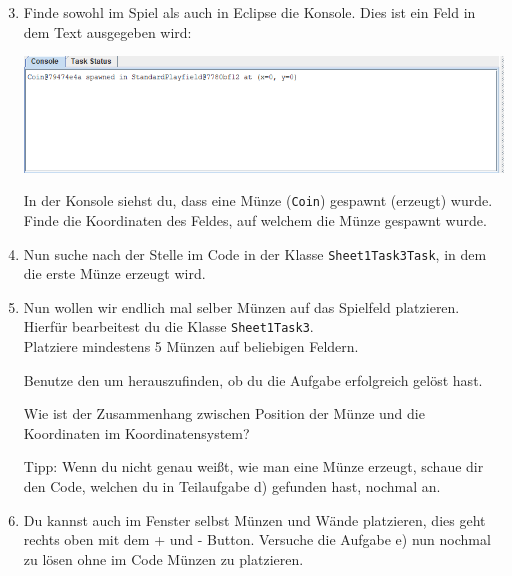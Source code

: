 \begin{enumerate}\setcounter{enumi}{2}

    \item Finde sowohl im Spiel als auch in Eclipse die Konsole. Dies ist ein Feld in dem Text ausgegeben wird:
    \begin{center}
        \includegraphics[width=\linewidth]{./figures/console.PNG}
    \end{center}

    In der Konsole siehst du, dass eine Münze (\texttt{Coin}) gespawnt (erzeugt) wurde.
    Finde die Koordinaten des Feldes, auf welchem die Münze gespawnt wurde.

    \item Nun suche nach der Stelle im Code in der Klasse \lstinline{Sheet1Task3Task}, in dem die erste Münze erzeugt wird.\\

    \item Nun wollen wir endlich mal selber Münzen auf das Spielfeld platzieren.
        Hierfür bearbeitest du die Klasse \lstinline{Sheet1Task3}.\\
        Platziere mindestens 5 Münzen auf beliebigen Feldern.

        Benutze den  um herauszufinden, ob du die Aufgabe erfolgreich gelöst hast.

        Wie ist der Zusammenhang zwischen Position der Münze und die Koordinaten im Koordinatensystem?

        Tipp: Wenn du nicht genau weißt, wie man eine Münze erzeugt, schaue dir den Code, welchen du in Teilaufgabe d) gefunden hast, nochmal an.
    \item Du kannst auch im Fenster selbst Münzen und Wände platzieren, dies geht rechts oben mit dem + und - Button. Versuche die Aufgabe e) nun nochmal zu lösen ohne im Code Münzen zu platzieren.
\end{enumerate}
